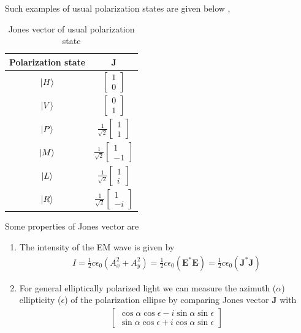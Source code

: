 \documentclass[11pt,a4paper]{article}
\numberwithin{equation}{section}
\begin{document}
Such examples of usual polarization states are given below \cite{jones},
\begin{table}[H]
	\centering
	\begin{tabular}{ c c } 
		\hline
		\hline
		Polarization state & $\boldsymbol{J}$\\
		\hline
		$\ket{H}$ & $\begin{bmatrix}1\\0\end{bmatrix}$ \\ \hline
		$\ket{V}$ & $\begin{bmatrix}0\\1\end{bmatrix}$ \\ \hline
		$\ket{P}$ & $\frac{1}{\sqrt{2}}\begin{bmatrix}1\\1\end{bmatrix}$ \\ \hline
		$\ket{M}$ & $\frac{1}{\sqrt{2}}\begin{bmatrix}1\\-1\end{bmatrix}$ \\ \hline
		$\ket{L}$ & $\frac{1}{\sqrt{2}}\begin{bmatrix}1\\i\end{bmatrix}$ \\ \hline
		$\ket{R}$ & $\frac{1}{\sqrt{2}}\begin{bmatrix}1\\-i\end{bmatrix}$ \\ 
		\hline
		\hline
	\end{tabular}
	\caption{Jones vector of usual polarization state}
	\label{table:1}
\end{table}

Some properties of Jones vector are
\begin{enumerate}
	\item The intensity of the EM wave is given by 
	\begin{align}
		I= \frac{1}{2}c\epsilon_0(A_x^2+A_y^2) = \frac{1}{2}c\epsilon_0 (\boldsymbol{E}^\ast \boldsymbol{E})= \frac{1}{2}c\epsilon_0 (\boldsymbol{J}^\ast \boldsymbol{J})
	\end{align}

	\item For general elliptically polarized light we can measure the azimuth ($\alpha$) ellipticity ($\epsilon$) of the polarization ellipse by comparing Jones vector $\boldsymbol{J}$ with \cite{WO}
	\begin{align*}
		\begin{bmatrix}
			\cos\alpha\cos\epsilon- i \sin\alpha\sin\epsilon \\
			\sin\alpha\cos\epsilon+ i \cos\alpha\sin\epsilon
		\end{bmatrix}
	\end{align*}
\end{enumerate}
\end{document}
